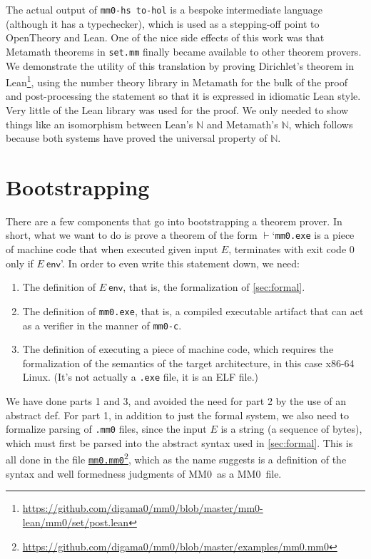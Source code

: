 \documentclass[runningheads]{llncs}
\newcommand{\mmO}{\textsf{MM0}}
\newcommand{\env}{\ \mathsf{env}}
\begin{document}
The actual output of \texttt{mm0-hs to-hol} is a bespoke intermediate language (although it has a typechecker), which is used as a stepping-off point to OpenTheory and Lean. One of the nice side effects of this work was that Metamath theorems in \texttt{set.mm} finally became available to other theorem provers. We demonstrate the utility of this translation by proving Dirichlet's theorem in Lean\footnote{
  \url{https://github.com/digama0/mm0/blob/master/mm0-lean/mm0/set/post.lean}
}, using the number theory library in Metamath for the bulk of the proof and post-processing the statement so that it is expressed in idiomatic Lean style. Very little of the Lean library was used for the proof. We only needed to show things like an isomorphism between Lean's $\mathbb{N}$ and Metamath's $\mathbb{N}$, which follows because both systems have proved the universal property of $\mathbb{N}$.

\section{Bootstrapping}\label{sec:bootstrap}
There are a few components that go into bootstrapping a theorem prover. In short, what we want to do is prove a theorem of the form $\vdash{}$`\texttt{mm0.exe} is a piece of machine code that when executed given input $E$, terminates with exit code $0$ only if $E\env$'. In order to even write this statement down, we need:
\begin{enumerate}
  \item The definition of $E\env$, that is, the formalization of \autoref{sec:formal}.
  \item The definition of \texttt{mm0.exe}, that is, a compiled executable artifact that can act as a verifier in the manner of \texttt{mm0-c}.
  \item The definition of executing a piece of machine code, which requires the formalization of the semantics of the target architecture, in this case x86-64 Linux. (It's not actually a \texttt{.exe} file, it is an ELF file.)
\end{enumerate}
We have done parts 1 and 3, and avoided the need for part 2 by the use of an abstract \textsf{def}. For part 1, in addition to just the formal system, we also need to formalize parsing of \texttt{.mm0} files, since the input $E$ is a string (a sequence of bytes), which must first be parsed into the abstract syntax used in \autoref{sec:formal}. This is all done in the file \href{https://github.com/digama0/mm0/blob/master/examples/mm0.mm0}{\texttt{mm0.mm0}}\footnote{
  \url{https://github.com/digama0/mm0/blob/master/examples/mm0.mm0}
  }, which as the name suggests is a definition of the syntax and well formedness judgments of \mmO\ as a \mmO\ file.
\end{document}
